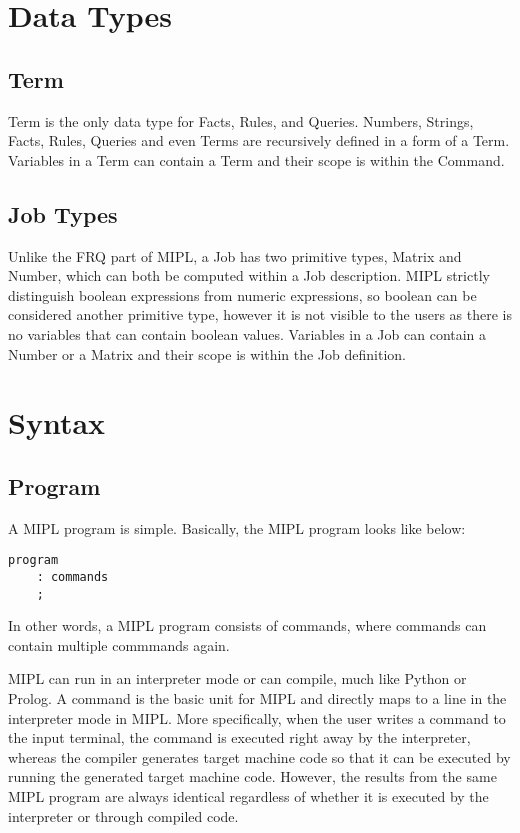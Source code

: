 \documentclass[prodmode,acmtecs]{acmsmall}
\begin{document}
\section{Data Types}

\subsection {Term}
Term is the only data type for Facts, Rules, and Queries.  Numbers, Strings,
Facts, Rules, Queries and even Terms are recursively defined in a form of a Term. 
Variables in a Term can contain a Term and their scope is within the Command.
\medskip

\subsection {Job Types}
Unlike the FRQ part of MIPL, a Job has two primitive types, Matrix and
Number, which can both be computed within a Job description. MIPL strictly
distinguish boolean expressions from numeric expressions, so boolean can be
considered another primitive type, however it is not visible to the users
as there is no variables that can contain boolean values.  Variables in a
Job can contain a Number or a Matrix and their scope is within the Job
definition.

\section{Syntax}

\subsection{Program}

A MIPL program is simple. Basically, the MIPL program looks like below:

\begin{lstlisting}
program
	: commands
	;
\end{lstlisting}

In other words, a MIPL program consists of commands, where commands can contain multiple 
commmands again.

MIPL can run in an interpreter mode or can compile, much like Python or Prolog. A command
is the basic unit for MIPL and directly maps to a line in the interpreter mode in MIPL.
More specifically, when the user writes a command to the
input terminal, the command is executed right away by the interpreter,
whereas the compiler generates target machine code so that it can be
executed by running the generated target machine code.  However, the
results from the same MIPL program are always identical regardless of
whether it is executed by the interpreter or through compiled code.
\end{document}
